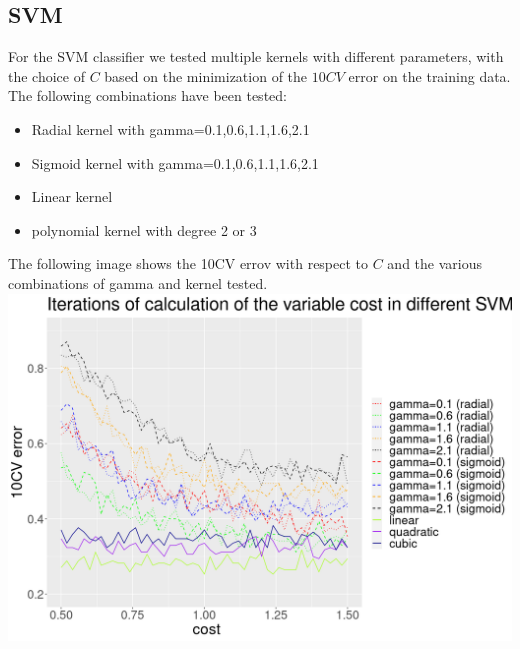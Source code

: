 \documentclass{article}
\begin{document}
\subsection{SVM}
For the SVM classifier we tested multiple kernels with different parameters, with the choice of $C$  based on the minimization of the $10CV$ error on the training data. The following combinations have been tested:
\begin{itemize}
\item Radial kernel with gamma=0.1,0.6,1.1,1.6,2.1
\item Sigmoid kernel with gamma=0.1,0.6,1.1,1.6,2.1
\item Linear kernel 
\item polynomial kernel with degree 2 or 3
\end{itemize}
The following image shows the 10CV errov with respect to $C$ and the various combinations of gamma and kernel tested.\\
\includegraphics[scale=0.30]{svm}
\\
\end{document}
